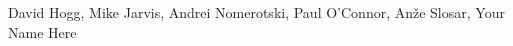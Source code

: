 \begin{center}
David Hogg,
Mike Jarvis,
Andrei Nomerotski,
Paul O'Connor,
An\v{z}e Slosar,
Your Name Here
\end{center}
